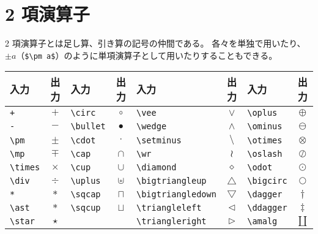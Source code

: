 \section{2 項演算子}
2 項演算子とは足し算、引き算の記号の仲間である。
各々を単独で用いたり、$\pm a$（\verb`$\pm a$`）のように単項演算子として用いたりすることもできる。\pagebreak
{}\begin{longtable}{@{}lclclclc@{}}
    入力          & 出力     & 入力           & 出力      & 入力                    & 出力               & 入力          & 出力         \\ \toprule
    \verb`+`      & $+$      & \verb`\circ`   & $\circ$   & \verb`\vee`             & $\vee$             & \verb`\oplus`   & $\oplus$   \\
    \verb`-`      & $-$      & \verb`\bullet` & $\bullet$ & \verb`\wedge`           & $\wedge$           & \verb`\ominus`  & $\ominus$  \\
    \verb`\pm`    & $\pm$    & \verb`\cdot`   & $\cdot$   & \verb`\setminus`        & $\setminus$        & \verb`\otimes`  & $\otimes$  \\
    \verb`\mp`    & $\mp$    & \verb`\cap`    & $\cap$    & \verb`\wr`              & $\wr$              & \verb`\oslash`  & $\oslash$  \\
    \verb`\times` & $\times$ & \verb`\cup`    & $\cup$    & \verb`\diamond`         & $\diamond$         & \verb`\odot`    & $\odot$    \\
    \verb`\div`   & $\div$   & \verb`\uplus`  & $\uplus$  & \verb`\bigtriangleup`   & $\bigtriangleup$   & \verb`\bigcirc` & $\bigcirc$ \\
    \verb`*`      & $*$      & \verb`\sqcap`  & $\sqcap$  & \verb`\bigtriangledown` & $\bigtriangledown$ & \verb`\dagger`  & $\dagger$  \\
    \verb`\ast`   & $\ast$   & \verb`\sqcup`  & $\sqcup$  & \verb`\triangleleft`    & $\triangleleft$    & \verb`\ddagger` & $\ddagger$ \\
    \verb`\star`  & $\star$  &                &           & \verb`\triangleright`   & $\triangleright$   & \verb`\amalg`   & $\amalg$   \\
\end{longtable}
